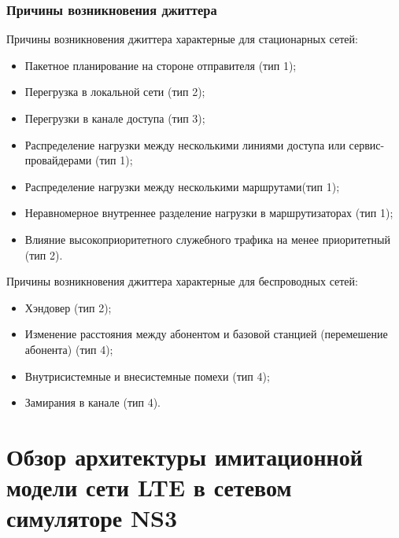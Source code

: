 \documentclass[10pt,pdf,hyperref={unicode}]{beamer}
\begin{document}
\begin{frame}
\frametitle{Причины возникновения джиттера}
{\footnotesize
\begin{exampleblock}
{Причины возникновения джиттера характерные для стационарных сетей:}
\begin{itemize}
\item Пакетное планирование на стороне отправителя (тип 1);
\item Перегрузка в локальной сети (тип 2);
\item Перегрузки в канале доступа (тип 3);
\item Распределение нагрузки между несколькими линиями доступа или сервис-провайдерами (тип 1);
\item Распределение нагрузки между несколькими маршрутами(тип 1);
\item Неравномерное внутреннее разделение нагрузки в маршрутизаторах (тип 1);
\item Влияние высокоприоритетного служебного трафика на менее приоритетный (тип 2).
\end{itemize}
\end{exampleblock}

\begin{exampleblock}
{Причины возникновения джиттера характерные для беспроводных сетей:}
\begin{itemize}
\item Хэндовер (тип 2);
\item Изменение расстояния между абонентом и базовой станцией (перемешение абонента) (тип 4);
\item Внутрисистемные и внесистемные помехи (тип 4);
\item Замирания в канале (тип 4).
\end{itemize}
\end{exampleblock}
}
\end{frame}







\section{Обзор архитектуры имитационной модели сети LTE в сетевом симуляторе NS3}
\end{document}
